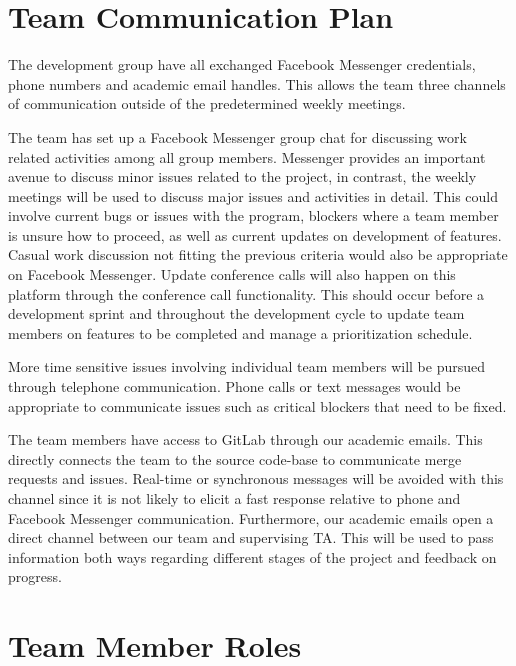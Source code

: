 \documentclass{article}
\begin{document}
\section{Team Communication Plan}
%
%

The development group have all exchanged Facebook Messenger credentials, phone
numbers and academic email handles. This allows the team three channels of
communication outside of the predetermined weekly meetings.

The team has set up a Facebook Messenger group chat for discussing work related
activities among all group members. Messenger provides an important avenue to
discuss minor issues related to the project, in contrast, the weekly meetings
will be used to discuss major issues and activities in detail. This could
involve current bugs or issues with the program, blockers where a team member is
unsure how to proceed, as well as current updates on development of features.
Casual work discussion not fitting the previous criteria would also be
appropriate on Facebook Messenger. Update conference calls will also happen on
this platform through the conference call functionality. This should occur
before a development sprint and throughout the development cycle to update team
members on features to be completed and manage a prioritization schedule.

More time sensitive issues involving individual team members will be pursued
through telephone communication. Phone calls or text messages would be
appropriate to communicate issues such as critical blockers that need to be
fixed.

The team members have access to GitLab through our academic emails. This
directly connects the team to the source code-base to communicate merge requests
and issues. Real-time or synchronous messages will be avoided with this channel
since it is not likely to elicit a fast response relative to phone and Facebook
Messenger communication. Furthermore, our academic emails open a direct channel
between our team and supervising TA. This will be used to pass information both
ways regarding different stages of the project and feedback on progress.


\section{Team Member Roles}
%
\end{document}
